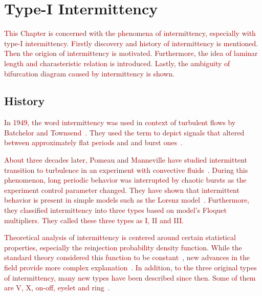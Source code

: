 \chapter{Type-I Intermittency}
\label{chap:type-I intermittency}

\textcolor{darkred}{
This Chapter is concerned with the phenomena of intermittency, especially with type-I intermittency.
Firstly discovery and history of intermittency is mentioned.
Then the origion of intermittency is motivated.
Furthermore, the idea of laminar length and charasteristic relation is introduced.
Lastly, the ambiguity of bifurcation diagram caused by intermittency is shown.
}

\section{History}
\textcolor{darkred}{
In 1949, the word intermittency was used in context of turbulent flows by Batchelor and Townsend~\cite{Batchelor19491025}.
They used the term to depict signals that altered between approximately flat periods and and burst ones~\cite{Elaskar2017}.
}
\par
\textcolor{darkred}{
About three decades later, Pomeau and Manneville have studied intermittent transition to turbulence in an experiment with convective fluids~\cite{Pomeau1980}.
During this phenomenon, long periodic behavior was interrupted by chaotic bursts as the experiment control parameter changed.
They have shown that intermittent behavior is present in simple models such as the Lorenz model~\cite{Lorenz2004}.
Furthermore, they classified intermittency into three types based on model's Floquet multipliers.
They called these three types as I, II and III.
}
\par
\textcolor{darkred}{
Theoretical analysis of intermittency is centered around certain statistical properties, especially the reinjection probability density function.
While the standard theory considered this function to be constant~\cite{Dubois1983}, new advances in the field provide more complex explanation~\cite{Elaskar2022}.
In addition, to the three original types of intermittency, many new types have been described since then.
Some of them are V, X, on-off, eyelet and ring~\cite{Elaskar2022}.
}

